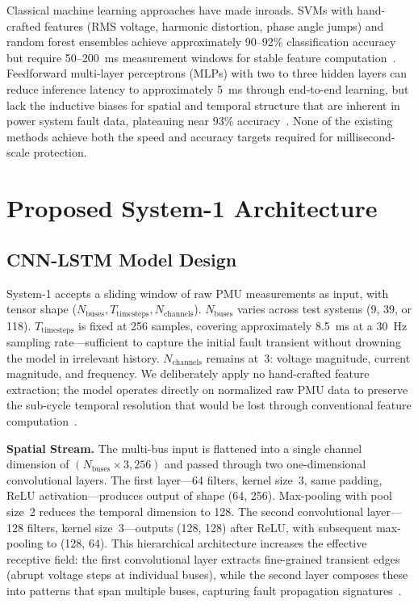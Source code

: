 \documentclass[journal]{IEEEtran}
\begin{document}
Classical machine learning approaches have made inroads. SVMs with hand-crafted features (RMS voltage, harmonic distortion, phase angle jumps) and random forest ensembles achieve approximately 90--92\% classification accuracy but require 50--200~ms measurement windows for stable feature computation~\cite{ref7,ref8}. Feedforward multi-layer perceptrons (MLPs) with two to three hidden layers can reduce inference latency to approximately 5~ms through end-to-end learning, but lack the inductive biases for spatial and temporal structure that are inherent in power system fault data, plateauing near 93\% accuracy~\cite{ref24}. None of the existing methods achieve both the speed and accuracy targets required for millisecond-scale protection.

\section{Proposed System-1 Architecture}
\label{sec:architecture}

\subsection{CNN-LSTM Model Design}

System-1 accepts a sliding window of raw PMU measurements as input, with tensor shape ($N_{\text{buses}}, T_{\text{timesteps}}, N_{\text{channels}}$). $N_{\text{buses}}$ varies across test systems (9, 39, or 118). $T_{\text{timesteps}}$ is fixed at 256 samples, covering approximately 8.5~ms at a 30~Hz sampling rate---sufficient to capture the initial fault transient without drowning the model in irrelevant history. $N_{\text{channels}}$ remains at~3: voltage magnitude, current magnitude, and frequency. We deliberately apply no hand-crafted feature extraction; the model operates directly on normalized raw PMU data to preserve the sub-cycle temporal resolution that would be lost through conventional feature computation~\cite{ref25}.

\textbf{Spatial Stream.} The multi-bus input is flattened into a single channel dimension of $(N_{\text{buses}} \times 3, 256)$ and passed through two one-dimensional convolutional layers. The first layer---64 filters, kernel size~3, same padding, ReLU activation---produces output of shape (64, 256). Max-pooling with pool size~2 reduces the temporal dimension to 128. The second convolutional layer---128 filters, kernel size~3---outputs (128, 128) after ReLU, with subsequent max-pooling to (128, 64). This hierarchical architecture increases the effective receptive field: the first convolutional layer extracts fine-grained transient edges (abrupt voltage steps at individual buses), while the second layer composes these into patterns that span multiple buses, capturing fault propagation signatures~\cite{ref26}.
\end{document}
